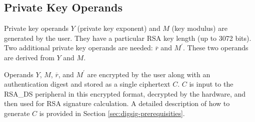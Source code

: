 \documentclass[main\_\_EN.tex]{subfiles}
\begin{document}
\subsection{Private Key Operands}
\label{sec:digsig-private-key-operands}

Private key operands \begin{math}Y\end{math} (private key exponent) and \begin{math}M\end{math} (key modulus) are generated by the user. They have a particular RSA key length (up to 3072 bits).
Two additional private key operands are needed: \begin{math}\overline{r}\end{math} and \begin{math}M^{\prime}\end{math}. These two operands are derived from \begin{math}Y\end{math} and \begin{math}M\end{math}.

Operands \begin{math}Y\end{math}, \begin{math}M\end{math}, \begin{math}\overline{r}\end{math}, and \begin{math}M^{\prime}\end{math} are encrypted by the user along with an authentication digest and stored as a single ciphertext \begin{math}C\end{math}. \begin{math}C\end{math} is input to the RSA\_DS peripheral in this encrypted format, decrypted by the hardware, and then used for RSA signature calculation. A detailed description of how to generate \begin{math}C\end{math} is provided in Section \ref{sec:digsig-prerequisities}.
\end{document}

